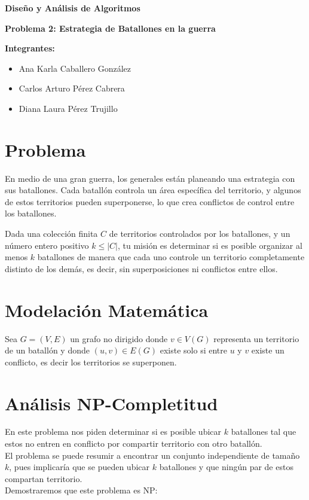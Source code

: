 \documentclass{article}
\begin{document}
\begin{titlepage}
    \centering
{\bfseries\Huge Diseño y Análisis de Algoritmos \par}
\vspace{2cm}
{\bfseries\Large Problema 2: Estrategia de Batallones en la guerra}
\vspace{2cm}

{\bfseries\Large Integrantes:}
\begin{center}
    \begin{itemize}
        \item Ana Karla Caballero González
        \item Carlos Arturo Pérez Cabrera
        \item Diana Laura Pérez Trujillo
    \end{itemize}
\end{center}


\end{titlepage}

\section{Problema}
En medio de una gran guerra, los generales están planeando una estrategia con sus batallones. Cada batallón controla un área específica del territorio, y algunos de estos territorios pueden superponerse, lo que crea conflictos de control entre los batallones.

Dada una colección finita $C$ de territorios controlados por los batallones, y un número entero positivo $k \leq |C|$, tu misión es determinar si es posible organizar al menos $k$ batallones de manera que cada uno controle un territorio completamente distinto de los demás, es decir, sin superposiciones ni conflictos entre ellos.


\section{Modelación Matemática}
Sea $G=(V,E)$ un grafo no dirigido donde $v \in V(G)$ representa un territorio de un batallón y donde $(u,v) \in E(G)$ existe solo si entre $u$ y $v$ existe un conflicto, es decir los territorios se superponen.

\section{Análisis NP-Completitud}
En este problema nos piden determinar si es posible ubicar $k$ batallones tal que estos no entren en conflicto por compartir territorio con otro batallón.
\\
El problema se puede resumir a encontrar un conjunto independiente de tamaño $k$, pues implicaría que se pueden ubicar $k$ batallones y que ningún par de estos compartan territorio.
\\
Demostraremos que este problema es NP:
\end{document}
